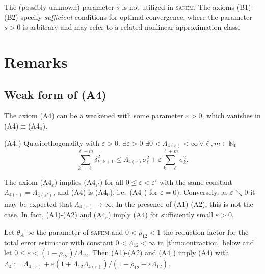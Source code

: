 \documentclass{siamltex1213}
\begin{document}
The (possibly unknown) parameter $s$ is not utilized in {\textsc{safem}\xspace}.
The axioms (B1)-(B2) specify {\em sufficient} conditions for optimal 
convergence, where the parameter 
$s>0$ is arbitrary and may refer to a related  nonlinear approximation class. 

	\section{Remarks}\label{sec:remarks}
	\subsection{Weak form of (A4)}
	The axiom (A4) can be a weakened with some parameter $\varepsilon>0$, which vanishes in 
	(A4)$\equiv$(A4$_0$).
	\begin{axioms}
		\item[(A4$_\varepsilon$)] Quasiorthogonality with $\varepsilon>0$.
		$\exists 
		\varepsilon>0$ $\exists 0<{\ensuremath{\Lambda_{\mathrm{4}(\varepsilon)}}}<\infty \, \forall \ell,m \in {\mathbb{N}_0}$
			\begin{equation}\label{eq:A4e}
				\sum_{k=\ell}^{\ell+m} \delta^2_{k, k+1} \leq {\ensuremath{\Lambda_{\mathrm{4}(\varepsilon)}}} \sigma_{\ell}^2  + \varepsilon \sum_{k=\ell}^{\ell+m} \sigma_{k}^2  \tag{A4$_\varepsilon$}.
			\end{equation}
		\end{axioms}

	The axiom (A4$_\varepsilon$) implies (A4$_{\varepsilon'}$) for all $0\leq\varepsilon<\varepsilon'$ 
	with the same constant ${\ensuremath{\Lambda_{\mathrm{4}(\varepsilon)}}}={\ensuremath{\Lambda_{\mathrm{4}(\varepsilon')}}}$, and (A4) is (A4$_0$), i.e.\  (A4$_\varepsilon$) for $\varepsilon=0$). Conversely, as $\varepsilon \searrow 0$ it may be expected 
	that ${\ensuremath{\Lambda_{\mathrm{4}(\varepsilon)}}} \rightarrow \infty$. In the presence of (A1)-(A2), this is not the case.  In fact, (A1)-(A2) 
	and (A4$_\varepsilon$) imply (A4) for sufficiently small $\varepsilon>0$.

	\begin{theorem}\label{thm:A4eA4} Let $\theta_A$ be the parameter of {\textsc{safem}\xspace} and $0<\rho_{12}<1$  the reduction factor for the total error estimator with constant $0<{\ensuremath{\Lambda_{\mathrm{12}}}}<\infty$ in \cref{thm:contraction} below and let
		$0\leq\varepsilon< (1-\rho_{12})/{\ensuremath{\Lambda_{\mathrm{12}}}}$.
		Then (A1)-(A2) and (A4$_\varepsilon$) imply (A4)
		with ${\ensuremath{\Lambda_{\mathrm{4}}}}:={\ensuremath{\Lambda_{\mathrm{4}(\varepsilon)}}}+\varepsilon (1+{\ensuremath{\Lambda_{\mathrm{12}}}} {\ensuremath{\Lambda_{\mathrm{4}(\varepsilon)}}})/(1-\rho_{12}-\varepsilon {\ensuremath{\Lambda_{\mathrm{12}}}})$.
	\end{theorem}
\end{document}
